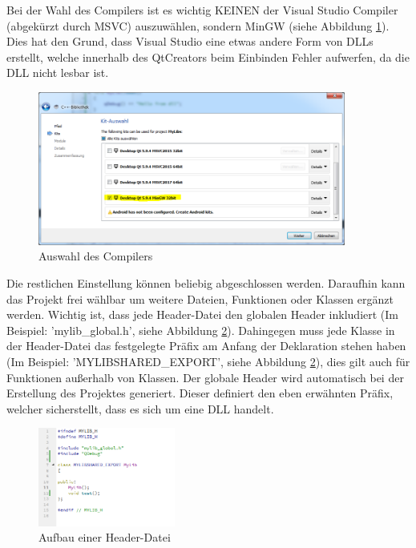 Bei der Wahl des Compilers ist es wichtig KEINEN der Visual Studio Compiler (abgekürzt durch MSVC) auszuwählen, sondern MinGW (siehe Abbildung \ref{fig:comp}). Dies hat den Grund, dass Visual Studio eine etwas andere Form von DLLs erstellt, welche innerhalb des QtCreators beim Einbinden Fehler aufwerfen, da die DLL nicht lesbar ist.
\begin{figure}[H]
	\centering
	\includegraphics[width=0.90\textwidth]{figures/qtCompiler.png}
	\caption{Auswahl des Compilers}
	\label{fig:comp}
\end{figure}
Die restlichen Einstellung können beliebig abgeschlossen werden.\newline
Daraufhin kann das Projekt frei wählbar um weitere Dateien, Funktionen oder Klassen ergänzt werden. Wichtig ist, dass jede Header-Datei den globalen Header inkludiert (Im Beispiel: 'mylib\_global.h', siehe Abbildung \ref{fig:head}). Dahingegen muss jede Klasse in der Header-Datei das festgelegte Präfix am Anfang der Deklaration stehen haben (Im Beispiel: 'MYLIBSHARED\_EXPORT', siehe Abbildung \ref{fig:head}), dies gilt auch für Funktionen außerhalb von Klassen. \newline
Der globale Header wird automatisch bei der Erstellung des Projektes generiert. Dieser definiert den eben erwähnten Präfix, welcher sicherstellt, dass es sich um eine DLL handelt.
\begin{figure}[H]
	\centering
	\includegraphics[width=0.40\textwidth]{figures/qtAufbau.png}
	\caption{Aufbau einer Header-Datei}
	\label{fig:head}
\end{figure}
